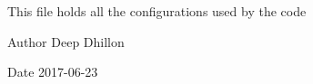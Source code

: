 This file holds all the configurations used by the code

\begin{DoxyAuthor}{Author}
Deep Dhillon 
\end{DoxyAuthor}
\begin{DoxyDate}{Date}
2017-\/06-\/23 
\end{DoxyDate}
